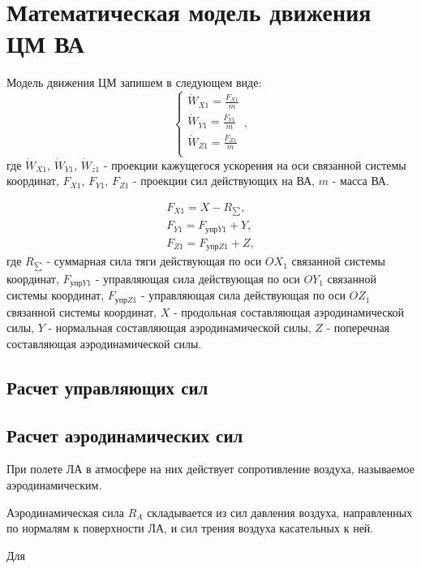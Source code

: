 \section{Математическая модель движения ЦМ ВА}
Модель движения ЦМ запишем в следующем виде:
\begin{equation}
	\left\{ \begin{matrix}
			\dot{W}_{X1} = \frac{F_{X1}}{m} \\
			\dot{W}_{Y1} = \frac{F_{Y1}}{m} \\
			\dot{W}_{Z1} = \frac{F_{Z1}}{m} \\
		\end{matrix} \right. ,
\end{equation}
где $\dot{W}_{X1}$, $\dot{W}_{Y1}$, $\dot{W}_{z1}$ - проекции кажущегося ускорения на оси связанной системы координат, $F_{X1}$, $F_{Y1}$, $F_{Z1}$ - проекции сил действующих на ВА, $m$ - масса ВА.

\begin{equation}
	\begin{gathered}
		F_{X1} = X - R_{\sum}, \\ 
		F_{Y1} = F_{\text{упр}Y1} + Y, \\
		F_{Z1} = F_{\text{упр}Z1} + Z,
	\end{gathered}
\end{equation}
где $R_{\sum}$ - суммарная сила тяги действующая по оси $OX_1$ связанной системы координат, $F_{\text{упр}Y1}$ - управляющая сила действующая по оси $OY_1$ связанной системы координат, $F_{\text{упр}Z1}$ - управляющая сила действующая по оси $OZ_1$ связанной системы координат, $X$ - продольная составляющая аэродинамической силы, $Y$ - нормальная составляющая аэродинамической силы, $Z$ - поперечная составляющая аэродинамической силы.
\clearpage

\subsection{Расчет управляющих сил}

\clearpage

\subsection{Расчет аэродинамических сил}
При полете ЛА в атмосфере на них действует сопротивление воздуха, называемое аэродинамическим.

Аэродинамическая сила $R_A$ складывается из сил давления воздуха, направленных по нормалям к поверхности ЛА, и сил трения воздуха касательных к ней. 

Для 

\clearpage